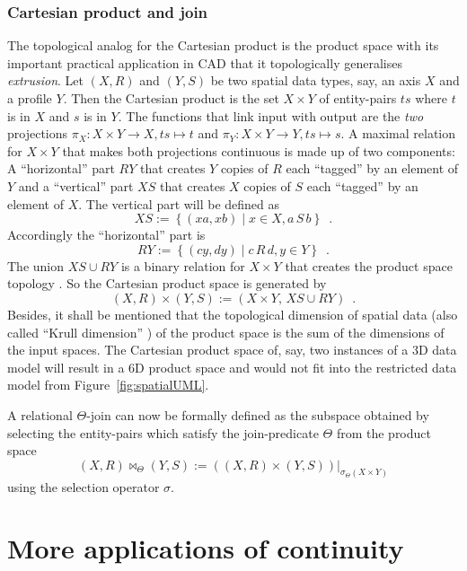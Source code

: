\documentclass[5p]{elsarticle}
\newcommand{\mathpset}[2]{\left\{#1\mid #2\right\}}
\newcommand{\qq}[1]{``#1''}
\begin{document}
\subsubsection{Cartesian product and join} 
The topological analog for the Cartesian product is the product space with 
its important practical application in CAD that it topologically generalises 
\emph{extrusion}. 
Let $(X,R)$ and $(Y,S)$ be two spatial data types, say, an axis $X$ and a profile $Y$. 
Then the Cartesian product is the set $X\times Y$ of entity-pairs $ts$ where $t$ is in $X$ 
and $s$ is in $Y$. 
The functions that link input with output are the \emph{two} projections 
$\pi_X:X\times Y\to X, ts \mapsto t$ and $\pi_Y:X\times Y\to Y, ts \mapsto s$. 
A maximal relation for $X\times Y$ that makes both projections continuous is made up of two 
components: 
A \qq{horizontal} part $\mathit{RY}$ that creates $Y$ copies of $R$ each \qq{tagged} by an element 
of $Y$ and a \qq{vertical} part $\mathit{XS}$ that creates $X$ copies of $S$ each \qq{tagged} by 
an element of $X$. 
The vertical part will be defined as 
$$
  \mathit{XS} := \mathpset{(xa, xb)}{x\in X, a\,S\,b}\enspace.
$$
Accordingly the \qq{horizontal} part is 
$$
  \mathit{RY} := \mathpset{(cy, dy)}{c\,R\,d, y\in Y}\enspace.
$$
The union $\mathit{XS} \cup \mathit{RY}$ is a binary relation for $X\times Y$ that 
creates the product space topology \cite{BradleyPaul}. 
So the Cartesian product space is generated by 
$$
  (X,R)\times(Y,S) := (X\times Y,\, \mathit{XS} \cup \mathit{RY})\enspace.
$$
Besides, it shall be mentioned that the topological dimension of spatial data 
(also called \qq{Krull dimension} \cite[p.\ 5]{Hartshorne:AlgebraicGeometry}) 
of the product space is the sum of the dimensions of the input spaces. 
The Cartesian product space of, say, two instances of a 3D data model 
will result in a 6D product space and would not fit into the restricted data model 
from Figure~\ref{fig:spatialUML}. 

A relational $\Theta$-join can now be formally defined as the subspace obtained by selecting 
the entity-pairs which satisfy the join-predicate $\Theta$ from the product space 
$$
  (X,R)\Join_\Theta(Y,S) := ((X,R)\times(Y,S))|_{\sigma_{\Theta}(X\times Y)}
$$
using the selection operator $\sigma$.


\section{More applications of continuity}\label{sec:applications2}
\end{document}
